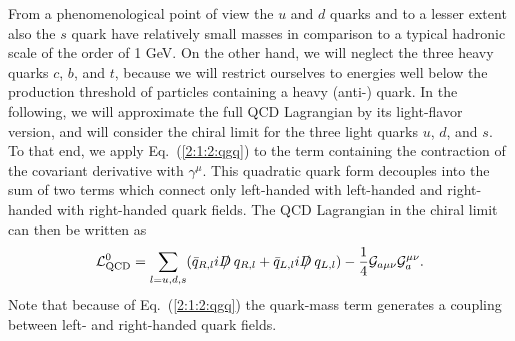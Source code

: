 \documentclass[twoside,12pt]{article}
\begin{document}
   From a phenomenological point of view the $u$ and $d$ quarks and to a lesser
extent also the $s$ quark have relatively small masses in comparison to a
typical hadronic scale of the order of 1 GeV.
   On the other hand, we will neglect the three heavy quarks $c$, $b$, and $t$,
because we will restrict ourselves to energies well below the production threshold
of particles containing a heavy (anti-) quark.
   In the following, we will approximate the full QCD Lagrangian by its
light-flavor version, and will consider the chiral limit for the three light
quarks $u$, $d$, and $s$.
   To that end, we apply Eq.\ (\ref{2:1:2:qgq}) to the term containing the contraction
of the covariant derivative with $\gamma^\mu$.
   This quadratic quark form decouples into the sum of two
terms which connect only left-handed with left-handed and right-handed
with right-handed quark fields.
   The QCD Lagrangian in the chiral limit can then be written as
\begin{equation}
\label{2:1:2:lqcd0lr}
{\cal L}^0_{\rm QCD}=\sum_{l=u,d,s}
(\bar{q}_{R,l}iD\hspace{-.6em}/\hspace{.3em}q_{R,l}+\bar{q}_{L,l}iD
\hspace{-.6em}/\hspace{.3em}
q_{L,l})-\frac{1}{4}{\cal G}_{a\mu\nu} {\cal G}^{\mu\nu}_a.
\end{equation}
   Note that because of Eq.\ (\ref{2:1:2:qgq}) the quark-mass term generates a
coupling between left- and right-handed quark fields.
\end{document}
